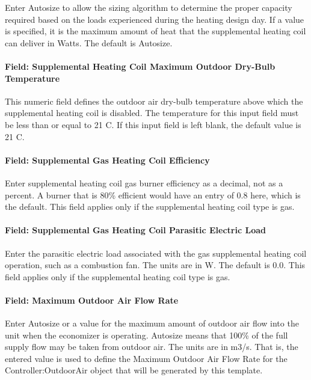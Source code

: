 Enter Autosize to allow the sizing algorithm to determine the proper capacity required based on the loads experienced during the heating design day. If a value is specified, it is the maximum amount of heat that the supplemental heating coil can deliver in Watts. The default is Autosize.

\paragraph{Field: Supplemental Heating Coil Maximum Outdoor Dry-Bulb Temperature}\label{field-supplemental-heating-coil-maximum-outdoor-dry-bulb-temperature-1}

This numeric field defines the outdoor air dry-bulb temperature above which the supplemental heating coil is disabled. The temperature for this input field must be less than or equal to 21 C. If this input field is left blank, the default value is 21 C.

\paragraph{Field: Supplemental Gas Heating Coil Efficiency}\label{field-supplemental-gas-heating-coil-efficiency-1}

Enter supplemental heating coil gas burner efficiency as a decimal, not as a percent. A burner that is 80\% efficient would have an entry of 0.8 here, which is the default. This field applies only if the supplemental heating coil type is gas.

\paragraph{Field: Supplemental Gas Heating Coil Parasitic Electric Load}\label{field-supplemental-gas-heating-coil-parasitic-electric-load-1}

Enter the parasitic electric load associated with the gas supplemental heating coil operation, such as a combustion fan. The units are in W. The default is 0.0. This field applies only if the supplemental heating coil type is gas.

\paragraph{Field: Maximum Outdoor Air Flow Rate}\label{field-maximum-outdoor-air-flow-rate-1}

Enter Autosize or a value for the maximum amount of outdoor air flow into the unit when the economizer is operating. Autosize means that 100\% of the full supply flow may be taken from outdoor air. The units are in m3/s. That is, the entered value is used to define the Maximum Outdoor Air Flow Rate for the Controller:OutdoorAir object that will be generated by this template.

